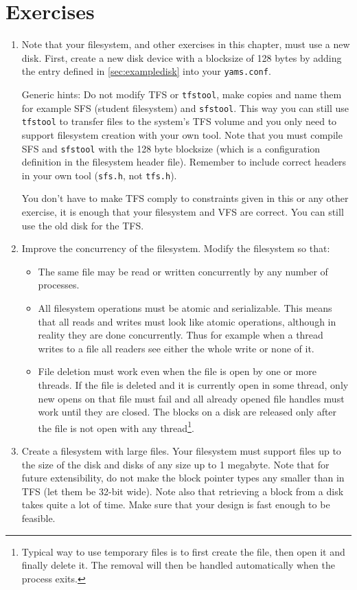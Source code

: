 \documentclass[twoside,a4paper]{report}
\newenvironment{exercises}[1][\addcontentsline{toc}{section}{Exercises}%
\section*{Exercises}\markright{EXERCISES}]{%
#1%
\begin{enumerate}%
}{%
\end{enumerate}
}
\newcounter{exercisec}[chapter]
\newcommand{\cexercise}[1]{%
\item[\stepcounter{exercisec}{\huge\Keyboard}\hspace{5mm}\textbf{\arabic{chapter}.\theexercisec{}.}] #1%
}
\begin{document}
\begin{exercises}

\item[]
Note that your filesystem, and other exercises in this chapter, must
use a new disk. First, create a new disk device with a blocksize of
128 bytes by adding the entry defined in \autoref{sec:exampledisk}
into your \texttt{yams.conf}.

Generic hints: Do not modify TFS or \texttt{tfstool}, make copies and
name them for example SFS (student filesystem) and \texttt{sfstool}.
This way you can still use \texttt{tfstool} to transfer files to the
system's TFS volume and you only need to support filesystem creation
with your own tool. Note that you must compile SFS and
\texttt{sfstool} with the 128 byte blocksize (which is a configuration
definition in the filesystem header file). Remember to include correct
headers in your own tool (\texttt{sfs.h}, not \texttt{tfs.h}).

You don't have to make TFS comply to constraints given in this or any
other exercise, it is enough that your filesystem and VFS are correct.
You can still use the old disk for the TFS.

\cexercise{Improve the concurrency of the filesystem. Modify the
filesystem so that:
\begin{itemize}
  \item The same file may be read or written concurrently by any
  number of processes.

  \item All filesystem operations must be atomic and serializable.
  This means that all reads and writes must look like atomic
  operations, although in reality they are done concurrently. Thus for
  example when a thread writes to a file all readers see either the whole
  write or none of it.

  \item File deletion must work even when the file is open by one or
  more threads. If the file is deleted and it is currently open in
  some thread, only new opens on that file must fail and all already
  opened file handles must work until they are closed. The blocks on a
  disk are released only after the file is not open with any
  thread\footnote{Typical way to use temporary files is to first
  create the file, then open it and finally delete it. The removal
  will then be handled automatically when the process exits.}.
\end{itemize}
}

\cexercise{Create a filesystem with large files. Your filesystem must
support files up to the size of the disk and disks of any size up to 1
megabyte. Note that for future extensibility, do not make the block
pointer types any smaller than in TFS (let them be 32-bit wide). Note
also that retrieving a block from a disk takes quite a lot of time.
Make sure that your design is fast enough to be feasible.}


\end{exercises}
\end{document}
